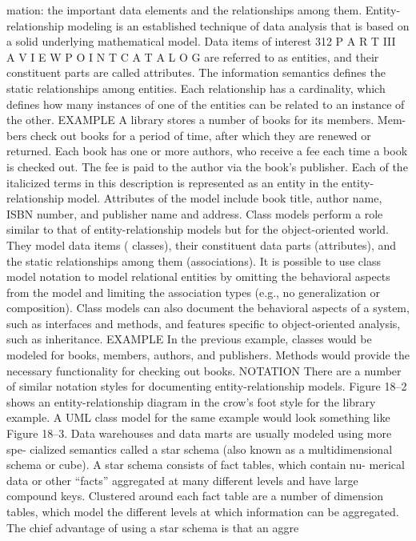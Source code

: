 mation: the important data elements and the relationships among them.
Entity-relationship modeling is an established technique of data analysis
that is based on a solid underlying mathematical model. Data items of interest
312
 P A R T III  A V I E W P O I N T C A T A L O G
are referred to as entities, and their constituent parts are called attributes. The
information semantics defines the static relationships among entities. Each
relationship has a cardinality, which defines how many instances of one of
the entities can be related to an instance of the other.
EXAMPLE A library stores a number of books for its members. Mem-
bers check out books for a period of time, after which they are renewed
or returned. Each book has one or more authors, who receive a fee
each time a book is checked out. The fee is paid to the author via the
book’s publisher.
Each of the italicized terms in this description is represented as an
entity in the entity-relationship model. Attributes of the model include
book title, author name, ISBN number, and publisher name and address.
Class models perform a role similar to that of entity-relationship models but
for the object-oriented world. They model data items ( classes), their constituent
data parts (attributes), and the static relationships among them (associations).
It is possible to use class model notation to model relational entities by omitting
the behavioral aspects from the model and limiting the association types (e.g.,
no generalization or composition).
Class models can also document the behavioral aspects of a system, such
as interfaces and methods, and features specific to object-oriented analysis,
such as inheritance.
EXAMPLE In the previous example, classes would be modeled for
books, members, authors, and publishers. Methods would provide the
necessary functionality for checking out books.
NOTATION There are a number of similar notation styles for documenting
entity-relationship models. Figure 18–2 shows an entity-relationship diagram
in the crow’s foot style for the library example.
A UML class model for the same example would look something like
Figure 18–3.
Data warehouses and data marts are usually modeled using more spe-
cialized semantics called a star schema (also known as a multidimensional
schema or cube). A star schema consists of fact tables, which contain nu-
merical data or other “facts” aggregated at many different levels and have
large compound keys. Clustered around each fact table are a number of
dimension tables, which model the different levels at which information can
be aggregated. The chief advantage of using a star schema is that an aggre
